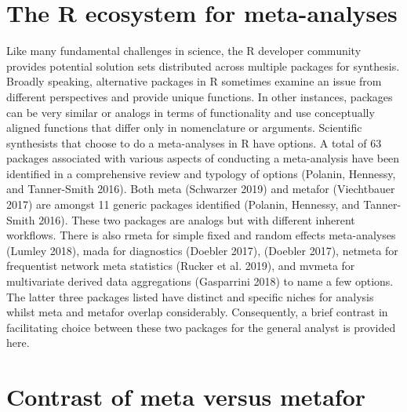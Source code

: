 \documentclass[fleqn,10pt]{wlpeerj} %
\begin{document}
\section*{The R ecosystem for
meta-analyses}\label{the-r-ecosystem-for-meta-analyses}

Like many fundamental challenges in science, the R developer community
provides potential solution sets distributed across multiple packages
for synthesis. Broadly speaking, alternative packages in R sometimes
examine an issue from different perspectives and provide unique
functions. In other instances, packages can be very similar or analogs
in terms of functionality and use conceptually aligned functions that
differ only in nomenclature or arguments. Scientific synthesists that
choose to do a meta-analyses in R have options. A total of 63 packages
associated with various aspects of conducting a meta-analysis have been
identified in a comprehensive review and typology of options (Polanin,
Hennessy, and Tanner-Smith 2016). Both meta (Schwarzer 2019) and metafor
(Viechtbauer 2017) are amongst 11 generic packages identified (Polanin,
Hennessy, and Tanner-Smith 2016). These two packages are analogs but
with different inherent workflows. There is also rmeta for simple fixed
and random effects meta-analyses (Lumley 2018), mada for diagnostics
(Doebler 2017), (Doebler 2017), netmeta for frequentist network meta
statistics (Rucker et al. 2019), and mvmeta for multivariate derived
data aggregations (Gasparrini 2018) to name a few options. The latter
three packages listed have distinct and specific niches for analysis
whilst meta and metafor overlap considerably. Consequently, a brief
contrast in facilitating choice between these two packages for the
general analyst is provided here.

\section*{Contrast of meta versus
metafor}\label{contrast-of-meta-versus-metafor}
\end{document}
